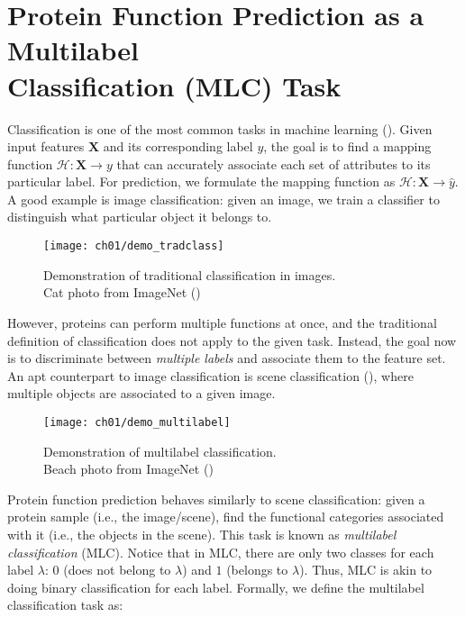 \section[Protein Function Prediction as a Multilabel Classification Task]
{Protein Function Prediction as a Multilabel\\Classification  (MLC) Task}
\label{MultilabelClassification}

\par Classification is one of the most common tasks in machine learning
(\cite{herrera2016multilabel}). Given input features $\mathbf{X}$ and its
corresponding label $y$, the goal is to find a mapping function $\mathcal{H}:
\mathbf{X} \rightarrow y$ that can accurately associate each set of
attributes to its particular label. For prediction, we formulate the mapping
function as $\mathcal{H}: \mathbf{X} \rightarrow \widehat{y}$. A good example
is image classification: given an image, we train a classifier to distinguish
what particular object it belongs to.

\begin{figure}[!h]
  \centering
  \texttt{[image: ch01/demo\_tradclass]}
  \caption[Demonstration of traditional classification in images]
  {Demonstration of traditional classification in images.\\Cat photo
  from ImageNet (\cite{russakovsky2015imagenet})}
  \label{demo:traditional}
\end{figure}

\par However, proteins can perform multiple functions at once, and the
traditional definition of classification does not apply to the given task.
Instead, the goal now is to discriminate between \textit{multiple labels} and
associate them to the feature set. An apt counterpart to image classification
is scene classification (\cite{boutell2004learning}), where multiple objects
are associated to a given image.

\begin{figure}[!h]
  \centering
  \texttt{[image: ch01/demo\_multilabel]}
  \caption[Demonstration of multilabel classification]
  {Demonstration of multilabel classification.\\Beach photo
  from ImageNet (\cite{russakovsky2015imagenet})}
  \label{demo:multilabel}
\end{figure}

\newpage
\par Protein function prediction behaves similarly to scene classification:
given a protein sample (i.e., the image/scene), find the functional categories
associated with it (i.e., the objects in the scene).  This task is known as
\textit{multilabel classification} (MLC). Notice that in MLC, there are only
two classes for each label $\lambda$: $0$ (does not belong to $\lambda$) and
$1$ (belongs to $\lambda$). Thus, MLC is akin to doing binary classification
for each label. Formally, we define the multilabel classification task as:


